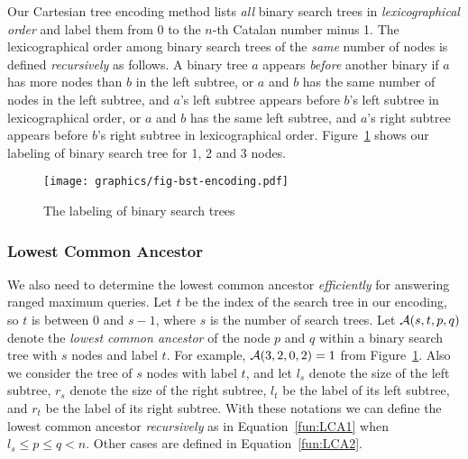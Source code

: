 Our Cartesian tree encoding method lists {\em all} binary search trees
in {\em lexicographical order} and label them from $0$ to the $n$-th
Catalan number minus 1.  The lexicographical order among binary search
trees of the {\em same} number of nodes is defined {\em recursively}
as follows.  A binary tree $a$ appears {\em before} another binary if
$a$ has more nodes than $b$ in the left subtree, or $a$ and $b$ has
the same number of nodes in the left subtree, and $a$'s left subtree
appears before $b$'s left subtree in lexicographical order, or $a$ and
$b$ has the same left subtree, and $a$'s right subtree appears before
$b$'s right subtree in lexicographical order.
Figure~\ref{fig:labelingBST} shows our labeling of binary search tree
for 1, 2 and 3 nodes.

\begin{figure}[!thb]
  \centering
  \texttt{[image: graphics/fig-bst-encoding.pdf]}
  \caption{The labeling of binary search trees}
  \label{fig:labelingBST}
\end{figure}

\subsubsection{Lowest Common Ancestor}

We also need to determine the lowest common ancestor {\em efficiently}
for answering ranged maximum queries.  Let $t$ be the index of the
search tree in our encoding, so $t$ is between 0 and $s - 1$, where
$s$ is the number of search trees.  Let ${\cal A}(s, t, p, q)$ denote
the {\em lowest common ancestor} of the node $p$ and $q$ within a
binary search tree with $s$ nodes and label $t$.  For example, ${\cal
  A}(3, 2, 0, 2) = 1$ from Figure~\ref{fig:labelingBST}.  Also we
consider the tree of $s$ nodes with label $t$, and let $l_s$ denote
the size of the left subtree, $r_s$ denote the size of the right
subtree, $l_t$ be the label of its left subtree, and $r_t$ be the
label of its right subtree.  With these notations we can define the
lowest common ancestor {\em recursively} as in Equation~\ref{fun:LCA1}
when $l_s \le p \le q < n$.  Other cases are defined in
Equation~\ref{fun:LCA2}.



